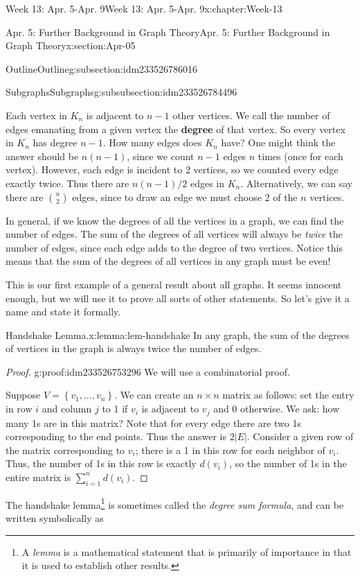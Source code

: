 \documentclass[oneside,10pt,]{book}
\newcommand{\terminology}[1]{\textbf{#1}}
\numberwithin{equation}{section}
\newcommand{\set}[1]{\left\{ {#1} \right\}}
\begin{document}
\begin{chapterptx}{Week 13: Apr. 5-Apr. 9}{}{Week 13: Apr. 5-Apr. 9}{}{}{x:chapter:Week-13}
\begin{sectionptx}{Apr. 5: Further Background in Graph Theory}{}{Apr. 5: Further Background in Graph Theory}{}{}{x:section:Apr-05}
\begin{subsectionptx}{Outline}{}{Outline}{}{}{g:subsection:idm233526786016}
\begin{subsubsectionptx}{Subgraphs}{}{Subgraphs}{}{}{g:subsubsection:idm233526784496}
\par
{} Each vertex in \(K_n\) is adjacent to \(n-1\) other vertices. We call the number of edges emanating from a given vertex the \terminology{degree} of that vertex. So every vertex in \(K_n\) has degree \(n-1\). How many edges does \(K_n\) have? One might think the answer should be \(n(n-1)\), since we count \(n-1\) edges \(n\) times (once for each vertex). However, each edge is incident to 2 vertices, so we counted every edge exactly twice. Thus there are \(n(n-1)/2\) edges in \(K_n\). Alternatively, we can say there are \({n \choose 2}\) edges, since to draw an edge we must choose 2 of the \(n\) vertices.%
\par
In general, if we know the degrees of all the vertices in a graph, we can find the number of edges. The sum of the degrees of all vertices will always be \emph{twice} the number of edges, since each edge adds to the degree of two vertices. Notice this means that the sum of the degrees of all vertices in any graph must be even!%
\par
This is our first example of a general result about all graphs.  It seems innocent enough, but we will use it to prove all sorts of other statements.  So let's give it a name and state it formally.%
\begin{lemma}{Handshake Lemma.}{}{x:lemma:lem-handshake}%
%
%
%
In any graph, the sum of the degrees of vertices in the graph is always twice the number of edges.%
\end{lemma}
\begin{proof}{}{g:proof:idm233526753296}
We will use a combinatorial proof.%
\par
Suppose \(V = \set{v_1,\ldots,v_n}\). We can create an \(n\times n\) matrix as follows: set the entry in row \(i\) and column \(j\) to 1 if \(v_i\) is adjacent to \(v_j\) and 0 otherwise. We ask: how many 1s are in this matrix? Note that for every edge there are two 1s corresponding to the end points. Thus the answer is \(2|E|\). Consider a given row of the matrix corresponding to \(v_i\); there is a 1 in this row for each neighbor of \(v_i\). Thus, the number of 1s in this row is exactly \(d(v_i)\), so the number of 1s in the entire matrix is \(\sum_{i=1}^n d(v_i)\).%
\end{proof}
The handshake lemma\footnote{A \emph{lemma} is a mathematical statement that is primarily of importance in that it is used to establish other results.\label{g:fn:idm233526746960}} is sometimes called the \emph{degree sum formula}, and can be written symbolically as%

\end{subsubsectionptx}
\end{subsectionptx}
\end{sectionptx}
\end{chapterptx}
\end{document}
